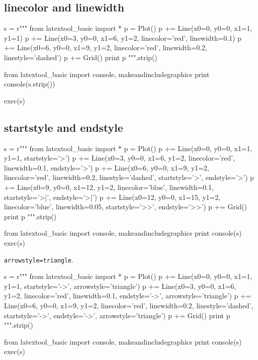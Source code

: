 \subsection{linecolor and linewidth}

\begin{python}
s = r"""
from latextool_basic import *
p = Plot()
p += Line(x0=0, y0=0, x1=1, y1=1)
p += Line(x0=3, y0=0, x1=6, y1=2, linecolor='red', linewidth=0.1)
p += Line(x0=6, y0=0, x1=9, y1=2, linecolor='red', linewidth=0.2, 
                                  linestyle='dashed')
p += Grid()
print p
""".strip()

from latextool_basic import console, makeandincludegraphics
print console(s.strip())

exec(s)
\end{python}




\newpage
\subsection{startstyle and endstyle}

\begin{python}
s = r"""
from latextool_basic import *
p = Plot()
p += Line(x0=0, y0=0, x1=1, y1=1, startstyle='>')
p += Line(x0=3, y0=0, x1=6, y1=2, linecolor='red', linewidth=0.1, 
                                  endstyle='>')
p += Line(x0=6, y0=0, x1=9, y1=2, linecolor='red', linewidth=0.2, 
                                  linestyle='dashed', 
                                  startstyle='>', endstyle='>')
p += Line(x0=9, y0=0, x1=12, y1=2, linecolor='blue', linewidth=0.1,  
                                   startstyle='>|', endstyle='>|')
p += Line(x0=12, y0=0, x1=15, y1=2, linecolor='blue', linewidth=0.05,  
                                   startstyle='>>', endstyle='>>')
p += Grid()
print p
""".strip()

from latextool_basic import console, makeandincludegraphics
print console(s)
exec(s)
\end{python}




\newpage
\verb!arrowstyle=triangle!.

\begin{python}
s = r"""
from latextool_basic import *
p = Plot()
p += Line(x0=0, y0=0, x1=1, y1=1, startstyle='->', arrowstyle='triangle')
p += Line(x0=3, y0=0, x1=6, y1=2, linecolor='red', linewidth=0.1, 
                                  endstyle='->', arrowstyle='triangle')
p += Line(x0=6, y0=0, x1=9, y1=2, linecolor='red', linewidth=0.2, 
                                  linestyle='dashed', 
                                  startstyle='->', endstyle='->', 
                                  arrowstyle='triangle')
p += Grid()
print p
""".strip()

from latextool_basic import console, makeandincludegraphics
print console(s)
exec(s)
\end{python}




